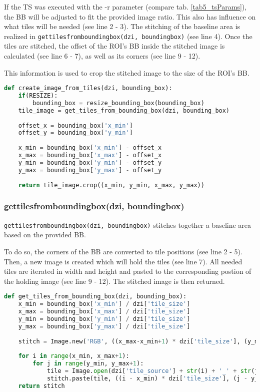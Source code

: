 If the TS was executed with the -r parameter (compare tab. \ref{tab5_tsParams}), the BB will be adjusted to fit the provided image ratio. This also has influence on what tiles will be needed (see line 2 - 3). The stitching of the baseline area is realized in \texttt{get{\textunderscore}tiles{\textunderscore}from{\textunderscore}bounding{\textunderscore}box(dzi, bounding{\textunderscore}box)} (see line 4). Once the tiles are stitched, the offset of the ROI's BB inside the stitched image is calculated (see line 6 - 7), as well as its corners (see line 9 - 12).

This information is used to crop the stitched image to the size of the ROI's BB.

\begin{lstlisting}[frame=single,language=python]
def create_image_from_tiles(dzi, bounding_box):
	if(RESIZE):
		bounding_box = resize_bounding_box(bounding_box)
	tile_image = get_tiles_from_bounding_box(dzi, bounding_box)
	
	offset_x = bounding_box['x_min']
	offset_y = bounding_box['y_min']
	
	x_min = bounding_box['x_min'] - offset_x
	x_max = bounding_box['x_max'] - offset_x
	y_min = bounding_box['y_min'] - offset_y
	y_max = bounding_box['y_max'] - offset_y
	
	return tile_image.crop((x_min, y_min, x_max, y_max))
\end{lstlisting}


\subsubsection{get{\textunderscore}tiles{\textunderscore}from{\textunderscore}bounding{\textunderscore}box(dzi, bounding{\textunderscore}box)}

\texttt{get{\textunderscore}tiles{\textunderscore}from{\textunderscore}bounding{\textunderscore}box(dzi, bounding{\textunderscore}box)} stitches together a baseline area  based on the provided BB.

To do so, the corners of the BB are converted to tile positions (see line 2 - 5). Then, a new image is created which will hold the tiles (see line 7). All needed tiles are iterated in width and height and pasted to the corresponding postion of the holding image (see line 9 - 12). The stitched image is then returned.

\begin{lstlisting}[frame=single,language=python]
def get_tiles_from_bounding_box(dzi, bounding_box):
	x_min = bounding_box['x_min'] / dzi['tile_size']
	x_max = bounding_box['x_max'] / dzi['tile_size']
	y_min = bounding_box['y_min'] / dzi['tile_size']
	y_max = bounding_box['y_max'] / dzi['tile_size']
	
	stitch = Image.new('RGB', ((x_max-x_min+1) * dzi['tile_size'], (y_max-y_min+1) * dzi['tile_size']))
	
	for i in range(x_min, x_max+1):
		for j in range(y_min, y_max+1):
			tile = Image.open(dzi['tile_source'] + str(i) + '_' + str(j) + '.' + dzi['format'])
			stitch.paste(tile, ((i - x_min) * dzi['tile_size'], (j - y_min) * dzi['tile_size']))
	return stitch
\end{lstlisting}


